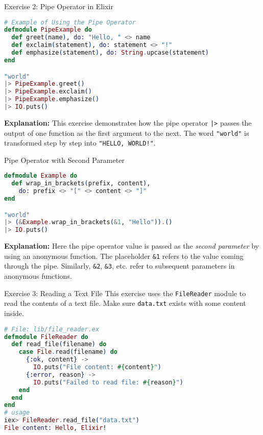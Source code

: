 \documentclass[aspectratio=169, table]{beamer}
\begin{document}
\begin{frame}[fragile]{Exercise 2: Pipe Operator in Elixir}
\vspace{20pt}

\begin{lstlisting}[language=Elixir, basicstyle=\ttfamily\footnotesize]
# Example of Using the Pipe Operator
defmodule PipeExample do
  def greet(name), do: "Hello, " <> name
  def exclaim(statement), do: statement <> "!"
  def emphasize(statement), do: String.upcase(statement)
end

"world"
|> PipeExample.greet()
|> PipeExample.exclaim()
|> PipeExample.emphasize()
|> IO.puts()
\end{lstlisting}

\textbf{Explanation:}  
This exercise demonstrates how the pipe operator \texttt{|>}  
passes the output of one function as the first argument to the next.  
The word \texttt{"world"} is transformed step by step into  
\texttt{"HELLO, WORLD!"}.
\end{frame}

\begin{frame}[fragile]{Pipe Operator with Second Parameter}
\vspace{20pt}

\begin{lstlisting}[language=Elixir, basicstyle=\ttfamily\footnotesize]
defmodule Example do
  def wrap_in_brackets(prefix, content), 
    do: prefix <> "[" <> content <> "]"
end

"world"
|> (&Example.wrap_in_brackets(&1, "Hello")).()
|> IO.puts()
\end{lstlisting}

\textbf{Explanation:}  
Here the pipe operator value is passed as the \textit{second parameter}  
by using an anonymous function. The placeholder \texttt{\&1} refers to the  
value coming through the pipe. Similarly, \texttt{\&2}, \texttt{\&3}, etc.  
refer to subsequent parameters in anonymous functions.
\end{frame}

\begin{frame}[fragile]{Exercise 3: Reading a Text File}
\vspace{20pt}
This exercise uses the \texttt{FileReader} module to read the contents  
of a text file. Make sure \texttt{data.txt} exists with some content inside.

\begin{lstlisting}[language=Elixir, basicstyle=\ttfamily\footnotesize]
# File: lib/file_reader.ex
defmodule FileReader do
  def read_file(filename) do
    case File.read(filename) do
      {:ok, content} ->
        IO.puts("File content: #{content}")
      {:error, reason} ->
        IO.puts("Failed to read file: #{reason}")
    end
  end
end
# usage
iex> FileReader.read_file("data.txt")
File content: Hello, Elixir!
\end{lstlisting}
\end{frame}
\end{document}
